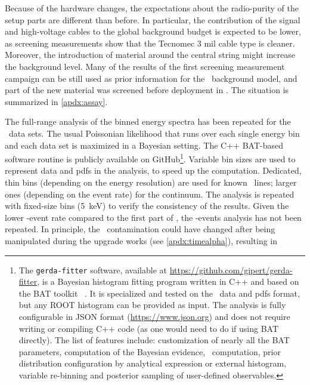 Because of the hardware changes, the expectations about the radio-purity of
the setup parts are different than before. In particular, the contribution of the signal
and high-voltage cables to the global background budget is expected to be lower, as
screening measurements show that the Tecnomec 3 mil cable type is cleaner. Moreover, the
introduction of material around the central string might increase the background level.
Many of the results of the first screening measurement campaign can be still used as prior
information for the \phasetwop\ background model, and part of the new material was
screened before deployment in \gerda. The situation is summarized in \cref{apdx:assay}.

The full-range analysis of the binned energy spectra has been repeated for the \phasetwop\
data sets. The usual Poissonian likelihood that runs over each single energy bin and each
data set is maximized in a Bayesian setting. The C++ BAT-based~\cite{Caldwell2008}
software routine is publicly available on GitHub\footnote{\label{footnote:gerda-fitter}%
  The \texttt{gerda-fitter} software, available at
  \url{https://github.com/gipert/gerda-fitter}, is a Bayesian histogram fitting program
  written in C++ and based on the BAT toolkit \m{v1.0.0}~\cite{Beaujean2018}. It is
  specialized and tested on the \gerda\ data and pdfs format, but any ROOT histogram can
  be provided as input. The analysis is fully configurable in JSON format
  (\url{https://www.json.org}) and does not require writing or compiling C++ code (as one
  would need to do if using BAT directly). The list of features include: customization of
  nearly all the BAT parameters, computation of the Bayesian evidence, \pvalue\
  computation, prior distribution configuration by analytical expression or external
  histogram, variable re-binning and posterior sampling of user-defined observables.
}. Variable bin sizes are used to represent data and pdfs in the analysis, to speed up the
computation. Dedicated, thin bins (depending on the energy resolution) are used for known
\g\ lines; larger ones (depending on the event rate) for the continuum. The analysis is
repeated with fixed-size bins (5~keV) to verify the consistency of the results.
\newpar
Given the lower \a-event rate compared to the first part of \phasetwo, the \a-events
analysis has not been repeated. In principle, the \Po\ contamination could have changed
after being manipulated during the upgrade works (see \cref{apdx:timealpha}), resulting in
